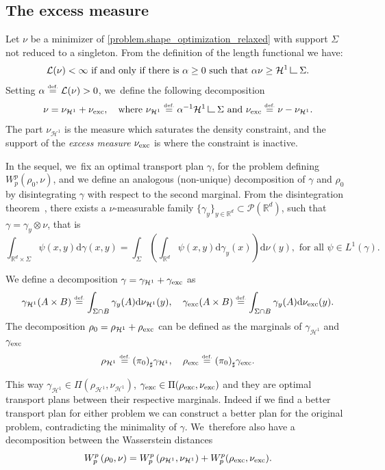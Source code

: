 \documentclass[JEP,XML,SOM,Unicode,NoFloatCountersInSection,published]{cedram}
\theoremstyle{definition}
\newcommand{\eqdef}{\ensuremath{\stackrel{\mbox{\upshape\tiny def.}}{=}}}
\newcommand\LM[1]{\hbox{\vrule width.5pt \vbox to#1pt{\vfill \hrule width#1pt height.5pt}}}
\newcommand\LL{{\mathchoice {\>\LM7\>}{\>\LM7\>}{\,\LM5\,}{\,\LM{3.35}\,}}}
\newcommand{\mres}{\LL}
\newcommand\cH{\mathcal{H}}
\newcommand{\RR}{\mathbb{R}}
\newcommand{\nuexc}{\nu_{\textup{exc}}}
\newcommand{\nuH}{\nu_{\cH^1}}
\newcommand{\rhoexc}{\rho_{\textup{exc}}}
\newcommand{\rhoH}{\rho_{\cH^1}}
\newcommand{\gammaexc}{\gamma_{\textup{exc}}}
\newcommand{\gammaH}{\gamma_{\cH^1}}
\newcommand\dd{\mathrm{d}}
\begin{document}
\subsection{The excess measure}
Let $\nu$ be a minimizer of \eqref{problem.shape_optimization_relaxed} with support
$\Sigma$ not reduced to a singleton. From the definition of the length functional we have:
\[
\mathcal{L}(\nu) < \infty \text{ if and only if there is $\alpha \ge 0$ such that } \alpha\nu \ge \cH^1\mres \Sigma.
\]
Setting $\alpha \eqdef \mathcal{L}(\nu)>0$, we~define the following decomposition
\begin{equation}\label{nuexceed}
\nu = \nuH + \nuexc,\quad
\text{where $\nuH \eqdef \alpha^{-1}\cH^1\mres \Sigma$ and $\nuexc \eqdef \nu - \nuH$}.
\end{equation}
The part $\nuH$ is the measure which saturates the density constraint, and the support of the \emph{excess measure} $\nuexc$ is where the constraint is inactive.

In the sequel, we~fix an optimal transport plan $\gamma$, for the problem defining $W_p^p(\rho_0, \nu)$, and we define an analogous (non-unique) decomposition of $\gamma$ and $\rho_0$ by disintegrating $\gamma$ with respect to the second marginal. From the disintegration theorem~\cite[Th.\,2.28]{ambrosio2000functions}, there exists a $\nu$-measurable family $\{\gamma_{y}\}_{y\in \RR^d} \subset \mathcal{P}(\RR^d)$, such that $\gamma= \gamma_y\otimes\nu$, that is\vspace*{-3pt}
\begin{equation}\label{disintegration_formula}
\int_{\RR^d \times \Sigma}
\psi(x, y)\dd \gamma(x,y)
=
\int_\Sigma
\left(
\int_{\RR^d} \psi(x,y)\dd \gamma_y(x)
\right)\dd\nu(y), \text{ for all $\psi \in L^1(\gamma)$}.
\end{equation}

We define a decomposition $\gamma = \gammaH + \gammaexc$ as
\begin{equation}\label{gammaexceed}
\gammaH(A\times B)\eqdef
\int_{\Sigma \cap B}
\gamma_y(A)
\dd\nuH(y),
\quad
\gammaexc(A\times B)\eqdef
\int_{\Sigma \cap B}
\gamma_y(A)
\dd\nuexc(y).
\end{equation}
The decomposition $\rho_0 = \rhoH + \rhoexc$ can be defined as the marginals of $\gammaH$ and $\gammaexc$
\begin{equation}\label{rhoexceed}
\rhoH \eqdef {(\pi_{0})}_\sharp \gammaH,
\quad
\rhoexc \eqdef {(\pi_{0})}_\sharp \gammaexc.
\end{equation}

This way $\gammaH \in \Pi(\rhoH, \nuH)$, $\gammaexc \in \Pi(\rhoexc, \nuexc)$ and they are optimal transport plans between their respective marginals. Indeed if we find a better transport plan for either problem we can construct a better plan for the original problem, contradicting the minimality of $\gamma$. We~therefore also have a decomposition between the Wasserstein distances\vspace*{-3pt}
\begin{equation}\label{rhoexc_decomposition_wasserstein}
W_p^p\left(\rho_0, \nu\right)
=
W_p^p\left(\rhoH, \nuH\right)
+
W_p^p(\rhoexc, \nuexc).
\end{equation}
\end{document}
